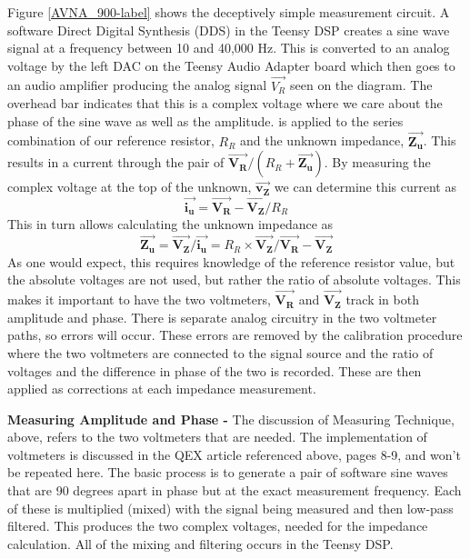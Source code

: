 %
Figure \ref{AVNA_900-label} shows the deceptively simple measurement circuit.  A software Direct Digital Synthesis (DDS) in the Teensy DSP creates a sine wave signal at a frequency between 10 and 40,000 Hz.  This is converted to an analog voltage by the left DAC on the Teensy Audio Adapter board which then goes to an audio amplifier producing the analog signal  $\vec{V_R}$ seen on the diagram.
The overhead bar indicates that this is a complex voltage where we care about the phase of the sine wave as well as the amplitude.   is applied to the series combination of our reference resistor, $R_R$ and the unknown impedance, $\vec{\mathbf{Z_u}}$.  This results in a current through the pair  of \(\vec{\mathbf{V_R}}  /  (R_R +   \vec{\mathbf{Z_u}})\).  By measuring the complex voltage at the top of the unknown, $\vec{\mathbf{v_Z}}$ we can determine this current as
\begin{equation}
 \vec{\mathbf{i_u}}=\vec{\mathbf{V_R}}-\vec{\mathbf{V_Z}}/R_R
\end{equation}
 This in turn allows calculating the unknown impedance as
\begin{equation}
\vec{\mathbf{Z_u}} =\vec{\mathbf{V_Z}}/\vec{\mathbf{i_u}}               =R_R \times\vec{\mathbf{V_Z}}/\vec{\mathbf{V_R}}-\vec{\mathbf{V_Z}}
\end{equation}
As one would expect, this requires knowledge of the reference resistor value, but the absolute voltages are not used, but rather the ratio of absolute voltages.  This makes it important to have the two voltmeters, $\vec{\mathbf{V_R}}$ and $\vec{\mathbf{V_Z}}$ track in both amplitude and phase.  There is separate analog circuitry in the two voltmeter paths, so errors will occur.  These errors are removed by the calibration procedure where the two voltmeters are connected to the signal source and the ratio  of voltages and the difference in phase of the two is recorded. These are then applied as corrections at each impedance measurement.

\textbf{Measuring Amplitude and Phase - }The discussion of Measuring Technique, above, refers to the two voltmeters that are needed.  The  implementation of voltmeters is discussed in the QEX article referenced above, pages 8-9,
and won't be repeated here.  The basic process is to generate a pair of software sine waves that are 90 degrees apart in phase but at the exact measurement frequency.  Each of these is multiplied (mixed) with the signal being measured and then low-pass filtered.  This produces the two complex voltages, needed for the impedance calculation.  All of the mixing and filtering occurs in the Teensy DSP.